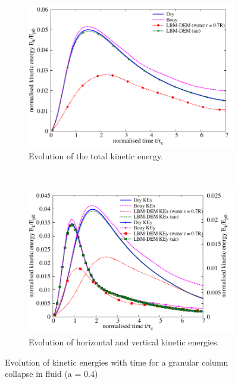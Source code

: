 \begin{figure}
\centering
\begin{subfigure}[t]{0.8\textwidth}
	\centering
    \includegraphics[width=\textwidth]{KE_a04f}
    \caption{Evolution of the total kinetic energy.}
    \label{fig:KE_a04f}
\end{subfigure}
\\
\begin{subfigure}[t]{0.95\textwidth}
	\centering
    \includegraphics[width=\textwidth]{KExy_a04f}
    \caption{Evolution of horizontal and vertical kinetic energies.}
    \label{fig:KExy_a04f}
\end{subfigure}
\caption{Evolution of kinetic energies with time for a granular column collapse 
in fluid (a = 0.4)}
\label{fig:a04f_energy}
\end{figure}

